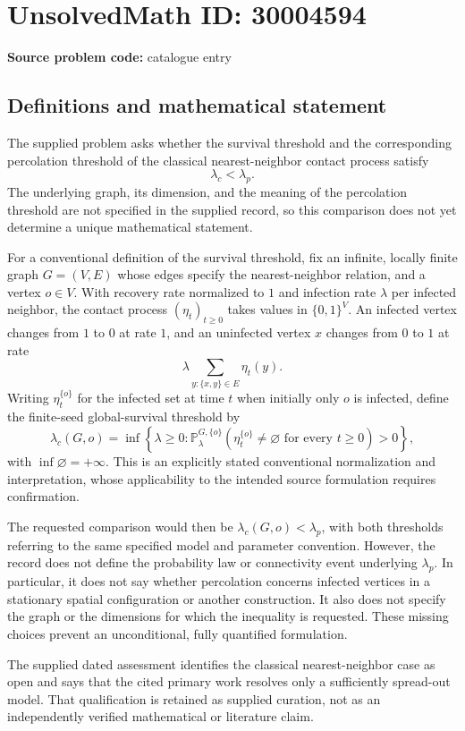 \documentclass[11pt]{article}
\begin{document}
\section*{UnsolvedMath ID: 30004594}
\textbf{Source problem code:} catalogue entry
\subsection{Definitions and mathematical statement}
The supplied problem asks whether the survival threshold and the corresponding percolation threshold of the classical nearest-neighbor contact process satisfy
\[
\lambda_c<\lambda_p.
\]
The underlying graph, its dimension, and the meaning of the percolation threshold are not specified in the supplied record, so this comparison does not yet determine a unique mathematical statement.

For a conventional definition of the survival threshold, fix an infinite, locally finite graph \(G=(V,E)\) whose edges specify the nearest-neighbor relation, and a vertex \(o\in V\). With recovery rate normalized to \(1\) and infection rate \(\lambda\) per infected neighbor, the contact process \((\eta_t)_{t\geq0}\) takes values in \(\{0,1\}^{V}\). An infected vertex changes from \(1\) to \(0\) at rate \(1\), and an uninfected vertex \(x\) changes from \(0\) to \(1\) at rate
\[
\lambda\sum_{y:\{x,y\}\in E}\eta_t(y).
\]
Writing \(\eta_t^{\{o\}}\) for the infected set at time \(t\) when initially only \(o\) is infected, define the finite-seed global-survival threshold by
\[
\lambda_c(G,o)=\inf\left\{\lambda\geq0:
\mathbb P_{\lambda}^{G,\{o\}}\!\left(\eta_t^{\{o\}}\neq\varnothing\text{ for every }t\geq0\right)>0\right\},
\]
with \(\inf\varnothing=+\infty\). This is an explicitly stated conventional normalization and interpretation, whose applicability to the intended source formulation requires confirmation.

The requested comparison would then be \(\lambda_c(G,o)<\lambda_p\), with both thresholds referring to the same specified model and parameter convention. However, the record does not define the probability law or connectivity event underlying \(\lambda_p\). In particular, it does not say whether percolation concerns infected vertices in a stationary spatial configuration or another construction. It also does not specify the graph or the dimensions for which the inequality is requested. These missing choices prevent an unconditional, fully quantified formulation.

The supplied dated assessment identifies the classical nearest-neighbor case as open and says that the cited primary work resolves only a sufficiently spread-out model. That qualification is retained as supplied curation, not as an independently verified mathematical or literature claim.
\end{document}

